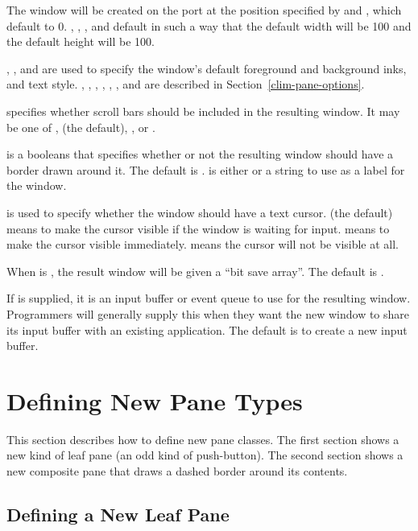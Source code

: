 The window will be created on the port  at the position specified by
 and , which default to 0.  , ,
, and  default in such a way that the default width will
be 100 and the default height will be 100.

, , and  are used to specify the
window's default foreground and background inks, and text style.
, , ,
, , , and  are
described in Section~\ref{clim-pane-options}.

 specifies whether scroll bars should be included in the
resulting window.  It may be one of ,  (the default),
, or .
 
 is a booleans that specifies whether or not the resulting window
should have a border drawn around it.  The default is .   is
either  or a string to use as a label for the window.

 is used to specify whether the window should
have a text cursor.   (the default) means to make the cursor visible if
the window is waiting for input.   means to make the cursor visible
immediately.   means the cursor will not be visible at all.

When  is , the result window will be given a ``bit
save array''.  The default is .

If  is supplied, it is an input buffer or event queue to use
for the resulting window.  Programmers will generally supply this when they want
the new window to share its input buffer with an existing application.  The
default is to create a new input buffer.


\section {Defining New Pane Types}

This section describes how to define new pane classes.  The first section shows
a new kind of leaf pane (an odd kind of push-button).  The second section shows
a new composite pane that draws a dashed border around its contents.

\subsection {Defining a New Leaf Pane}

